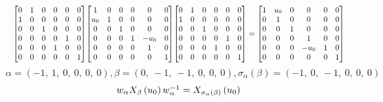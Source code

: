 \documentclass[11pt]{article}
\theoremstyle{definition}
\begin{document}
\[
\scaletoalign{\textwidth}{{\left[\begin{matrix}0 & 1 & 0 & 0 & 0 & 0\\1 & 0 & 0 & 0 & 0 & 0\\0 & 0 & 1 & 0 & 0 & 0\\0 & 0 & 0 & 0 & 1 & 0\\0 & 0 & 0 & 1 & 0 & 0\\0 & 0 & 0 & 0 & 0 & 1\end{matrix}\right]} {\left[\begin{matrix}1 & 0 & 0 & 0 & 0 & 0\\u_{0} & 1 & 0 & 0 & 0 & 0\\0 & 0 & 1 & 0 & 0 & 0\\0 & 0 & 0 & 1 & - u_{0} & 0\\0 & 0 & 0 & 0 & 1 & 0\\0 & 0 & 0 & 0 & 0 & 1\end{matrix}\right]} {\left[\begin{matrix}0 & 1 & 0 & 0 & 0 & 0\\1 & 0 & 0 & 0 & 0 & 0\\0 & 0 & 1 & 0 & 0 & 0\\0 & 0 & 0 & 0 & 1 & 0\\0 & 0 & 0 & 1 & 0 & 0\\0 & 0 & 0 & 0 & 0 & 1\end{matrix}\right]} = {\left[\begin{matrix}1 & u_{0} & 0 & 0 & 0 & 0\\0 & 1 & 0 & 0 & 0 & 0\\0 & 0 & 1 & 0 & 0 & 0\\0 & 0 & 0 & 1 & 0 & 0\\0 & 0 & 0 & - u_{0} & 1 & 0\\0 & 0 & 0 & 0 & 0 & 1\end{matrix}\right]}}
\]
\[
\alpha = \left( -1, \  1, \  0, \  0, \  0, \  0\right), \beta = \left( 0, \  -1, \  -1, \  0, \  0, \  0\right), \sigma_{\alpha}(\beta) = \left( -1, \  0, \  -1, \  0, \  0, \  0\right)
\]
\[
\scaletoalign{\textwidth}{w_{\alpha} X_{\beta}\left(u_{0}\right) w_{\alpha}^{-1} = X_{\sigma_{\alpha}\left(\beta\right)}\left(u_{0}\right)}
\]
\end{document}
